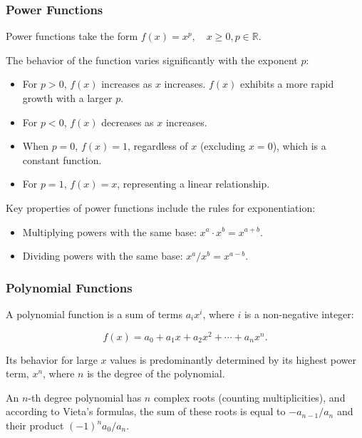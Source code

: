 \documentclass[12pt]{article}
\theoremstyle{definition}
\begin{document}
\subsubsection*{Power Functions}

Power functions take the form $f(x) = x^p, \quad x \geq 0, p \in \mathbb{R}$. 

The behavior of the function varies significantly with the exponent $p$:

\begin{itemize}
    \item For $p > 0$, $f(x)$ increases as $x$ increases. $f(x)$ exhibits a more rapid growth with a larger $p$.
    
    \item For $p < 0$, $f(x)$ decreases as $x$ increases.
    
    \item When $p = 0$, $f(x) = 1$, regardless of $x$ (excluding $x = 0$), which is a constant function.
    
    \item For $p = 1$, $f(x) = x$, representing a linear relationship.
\end{itemize}

Key properties of power functions include the rules for exponentiation:

\begin{itemize}
    \item Multiplying powers with the same base: $x^a \cdot x^b = x^{a+b}$.
    
    \item Dividing powers with the same base: $x^a / x^b = x^{a-b}$.
\end{itemize}

\subsubsection*{Polynomial Functions}

A polynomial function is a sum of terms $a_i x^i$, where $i$ is a non-negative integer:

\[
f(x) = a_0 + a_1 x + a_2 x^2 + \cdots + a_n x^n.
\]

Its behavior for large $x$ values is predominantly determined by its highest power term, $x^n$, where $n$ is the degree of the polynomial.

An $n$-th degree polynomial has $n$ complex roots (counting multiplicities), and according to Vieta's formulas, the sum of these roots is equal to $-a_{n-1}/a_n$ and their product $(-1)^n a_0/a_n$.
\end{document}
